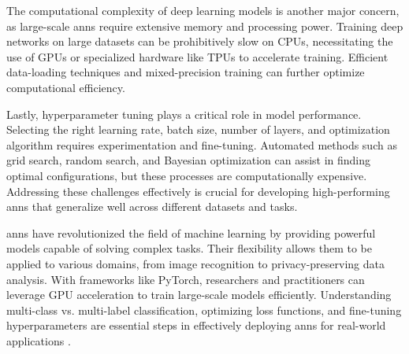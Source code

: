 The computational complexity of deep learning models is another major concern, as large-scale \ac{ann}s require extensive memory and processing power.
Training deep networks on large datasets can be prohibitively slow on CPUs, necessitating the use of GPUs or specialized hardware like TPUs to accelerate training.
Efficient data-loading techniques and mixed-precision training can further optimize computational efficiency.

Lastly, hyperparameter tuning plays a critical role in model performance.
Selecting the right learning rate, batch size, number of layers, and optimization algorithm requires experimentation and fine-tuning.
Automated methods such as grid search, random search, and Bayesian optimization can assist in finding optimal configurations, but these processes are computationally expensive.
Addressing these challenges effectively is crucial for developing high-performing \ac{ann}s that generalize well across different datasets and tasks.

\ac{ann}s have revolutionized the field of machine learning by providing powerful models capable of solving complex tasks.
Their flexibility allows them to be applied to various domains, from image recognition to privacy-preserving data analysis.
With frameworks like PyTorch, researchers and practitioners can leverage GPU acceleration to train large-scale models efficiently.
Understanding multi-class vs. multi-label classification, optimizing loss functions, and fine-tuning hyperparameters are essential steps in effectively deploying \ac{ann}s for real-world applications \cite{goodfellow2016deep}.

